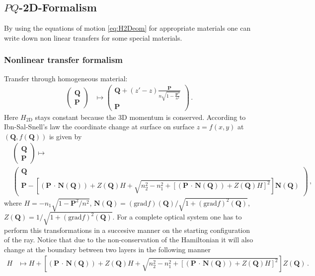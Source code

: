 \documentclass[12pt,a4paper,twoside,openright,BCOR10mm,headsepline,titlepage,abstracton,chapterprefix,final]{scrreprt}
\newcommand\Vector[1]{{\mathbf{#1}}}
\newcommand{\scpm}[2]{(#1\,\cdot\,#2)}
\begin{document}
\subsection{\texorpdfstring{$PQ$}{PQ}-2D-Formalism}

By using the equations of motion \eqref{eq:H2Deom} for appropriate materials one can write down non linear transfers for
some special materials.

\subsubsection{Nonlinear transfer formalism}

Transfer through homogeneous material:
\begin{align}
 \begin{pmatrix}
  \Vector{Q} \\
  \Vector{P}
 \end{pmatrix} &\mapsto
 \begin{pmatrix}
  \Vector{Q} + (z' -z) \frac{\Vector{P}}{n \sqrt{1 - \frac{\Vector{P}^2}{n^2}}} \\
  \Vector{P}
 \end{pmatrix}\,.
\end{align}
Here $H_{\text{2D}}$ stays constant because the 3D momentum is conserved.
According to Ibn-Sal-Snell's law the coordinate change at surface on surface $z = f(x,y)$ at $(\Vector{Q} , f(\Vector{Q}))$ is given by
\begin{align}
 &\begin{pmatrix}
  \Vector{Q} \\
  \Vector{P}
 \end{pmatrix} \mapsto\nonumber\\&
 \begin{pmatrix}
  \Vector{Q} \\
  \Vector{P} - \left[\scpm{\Vector{P}}{\Vector{N}(\Vector{Q})} + Z(\Vector{Q}) H + \sqrt{n_2^2 - n_1^2 + [\scpm{\Vector{P}}{\Vector{N}(\Vector{Q})} + Z(\Vector{Q})H]^2}\right] \Vector{N}(\Vector{Q})
 \end{pmatrix}\,,
\end{align}
where $H = -n_1 \sqrt{1 - \Vector{P}^2/n^2}$, 
$\Vector{N}(\Vector{Q}) = (\text{grad} f)(\Vector{Q})/\sqrt{1 + (\text{grad} f)^2(\Vector{Q})}$, 
$Z(\Vector{Q}) = 1/\sqrt{1 + (\text{grad} f)^2(\Vector{Q})}$.
For a complete optical system one has to perform this transformations in a succesive manner on the starting configuration of the ray.
Notice that due to the non-conservation of the Hamiltonian it will also change at the boundary between two layers in the following manner
\begin{align}
 H &\mapsto H + \left[\scpm{\Vector{P}}{\Vector{N}(\Vector{Q})} + Z(\Vector{Q}) H + \sqrt{n_2^2 - n_1^2 + [\scpm{\Vector{P}}{\Vector{N}(\Vector{Q})} + Z(\Vector{Q})H]^2}\right] Z(\Vector{Q})\,.
\end{align}
\end{document}
